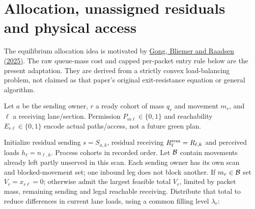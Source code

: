 \documentclass[10pt,a4paper]{article}
\begin{document}
\section{Allocation, unassigned residuals and physical access}


The equilibrium allocation idea is motivated by
\href{https://doi.org/10.1016/j.trb.2025.103208}{Gong, Bliemer and Raadsen (2025)}.
The raw queue-mass cost and capped per-packet entry rule below are the
present adaptation. They are derived from a strictly convex load-balancing
problem, not claimed as that paper's original exit-resistance equation
or general algorithm.
\par

Let $a$ be the sending owner, $r$ a ready cohort of mass $q_r$ and
movement $m_r$, and $\ell$ a receiving lane/section.
Permission $P_{m\ell}\in\{0,1\}$ and reachability
$E_{r\ell}\in\{0,1\}$ encode actual paths/access, not a future green plan.

Initialize residual sending $s=S_{a,k}$, residual receiving
$R^{\rm rem}_\ell=R_{\ell,k}$ and perceived loads $h_\ell=n_{\ell,k}$.
Process cohorts in recorded order. Let ${\cal B}$ contain movements
already left partly unserved in this scan. Each sending owner has its own
scan and blocked-movement set; one inbound leg does not block another.
If $m_r\in{\cal B}$ set $V_r=x_{r\ell}=0$; otherwise admit the largest
feasible total $V_r$, limited by packet mass, remaining sending and
legal reachable receiving. Distribute that total to reduce differences
in current lane loads, using a common filling level $\lambda_r$:
\end{document}
